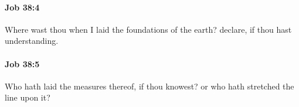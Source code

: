 		\paragraph{Job 38:4} %
			\label{JOB-38-4}

			Where wast thou when I laid the foundations of the earth? declare, if thou hast understanding.


		\paragraph{Job 38:5} %
			\label{JOB-38-5}

			Who hath laid the measures thereof, if thou knowest? or who hath stretched the line upon it?


